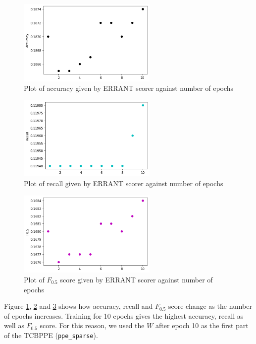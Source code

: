 \documentclass[12pt,a4paper,twoside,openright]{report}
\begin{document}
\begin{figure}[ht]
\centering
\includegraphics[width=0.6\textwidth]{images/sparse_acc.png}
\caption{Plot of accuracy given by ERRANT scorer against number of epochs}
\label{fig:sparse_acc}
\end{figure}

\begin{figure}[ht]
\centering
\includegraphics[width=0.6\textwidth]{images/sparse_rec.png}
\caption{Plot of recall given by ERRANT scorer against number of epochs}
\label{fig:sparse_rec}
\end{figure}

\begin{figure}[ht]
\centering
\includegraphics[width=0.6\textwidth]{images/sparse_f.png}
\caption{Plot of $F_{0.5}$ score given by ERRANT scorer against number of epochs}
\label{fig:sparse_f}
\end{figure}

Figure \ref{fig:sparse_acc}, \ref{fig:sparse_rec} and \ref{fig:sparse_f} shows how accuracy, recall and $F_{0.5}$ score change as the number of epochs increases. Training for 10 epochs gives the highest accuracy, recall as well as $F_{0.5}$ score. For this reason, we used the $W$ after epoch 10 as the first part of the TCBPPE (\texttt{ppe\_sparse}). 
\end{document}
